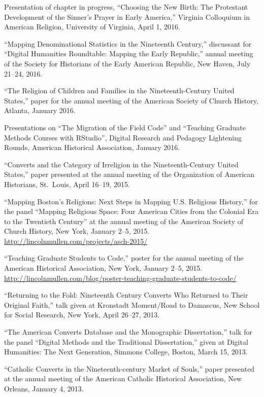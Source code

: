 \documentclass[11pt]{article}
\begin{document}
Presentation of chapter in progress, ``Choosing the New Birth: The Protestant 
Development of the Sinner's Prayer in Early America,'' Virginia Colloquium in 
American Religion, University of Virginia, April 1, 2016.

``Mapping Denominational Statistics in the Nineteenth Century,'' discussant 
for ``Digital Humanities Roundtable: Mapping the Early Republic,'' annual 
meeting of the Society for Historians of the Early American Republic, New 
Haven, July 21--24, 2016.

``The Religion of Children and Families in the Nineteenth-Century United 
States,'' paper for the annual meeting of the American Society of 
Church History, Atlanta, January 2016.

Presentations on ``The Migration of the Field Code'' and ``Teaching 
Graduate Methods Courses with RStudio'', Digital Research and Pedagogy 
Lightening Rounds, American Historical Association, January 2016.

``Converts and the Category of Irreligion in the Nineteenth-Century
United States,'' paper presented at the annual meeting of the
Organization of American Historians, St.~Louis, April 16--19, 2015.

``Mapping Boston's Religions: Next Steps in Mapping U.S. Religious History,'' 
for the panel ``Mapping Religious Space: Four American Cities from the 
Colonial Era to the Twentieth Century'' at the annual meeting of the American 
Society of Church History, New York, January 2--5, 2015.  
\url{http://lincolnmullen.com/projects/asch-2015/}

``Teaching Graduate Students to Code,'' poster for the annual meeting of the
American Historical Association, New York, January 2--5, 2015.
\url{http://lincolnmullen.com/blog/poster-teaching-graduate-students-to-code/}

``Returning to the Fold: Nineteenth Century Converts Who Returned to
Their Original Faith,'' talk given at Kronstadt Moment/Road to Damascus,
New School for Social Research, New York, April 26--27, 2013.

``The American Converts Database and the Monographic Dissertation,''
talk for the panel ``Digital Methods and the Traditional Dissertation,''
given at Digital Humanities: The Next Generation, Simmons College,
Boston, March 15, 2013.

``Catholic Converts in the Nineteenth-century Market of Souls,'' paper
presented at the annual meeting of the American Catholic Historical
Association, New Orleans, January 4, 2013.
\end{document}

